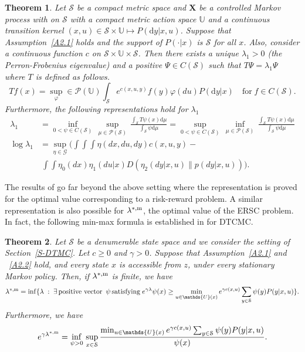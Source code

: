 \documentclass[notitlepage,11pt,reqno]{amsart}
\numberwithin{equation}{section}
\theoremstyle{plain}
\newtheorem{theorem}{Theorem}[section]
\theoremstyle{definition}
\theoremstyle{remark}
\newcommand{\Act}{{\mathds{U}}}
\newcommand{\cG}{{\mathcal{G}}}     %
\newcommand{\Pm}{{\mathcal{P}}}     %
\newcommand{\cS}{{\mathcal{S}}}     %
\newcommand{\lamstrdm}{\lambda^{*,{\rm m}}}
\newcommand{\D}{\mathrm{d}} %
\begin{document}
\begin{theorem}\label{Ven}
Let $\cS$ be a compact metric space and $\textbf{X}$ be a controlled Markov process with on $\cS$ with a compact metric action space $\Act$ and a continuous transition kernel $(x,u) \in \cS\times\Act \mapsto P(\D{y}|x,u)$. Suppose that Assumption~\ref{A2.1} holds and
the support of $P(\cdot|x)$ is $\cS$ for all $x$. Also, consider a continuous function $c$ on $\cS\times\Act\times\cS$.
 Then there exists a unique $\lambda_1>0$ (the Perron-Frobenius eigenvalue) and a positive $\Psi\in C(\cS)$ such that
$T\Psi=\lambda_1\Psi$ where $T$ is defined as follows.
$$T f(x)=\sup_\varphi\in\Pm(\Act)\int_\cS e^{c(x,u,y)} f(y)\varphi(du) P(\D{y}|x)\quad \text{for}\; f\in C(\cS).$$
Furthermore, the following representations hold for $\lambda_1$
\begin{align*}
\lambda_1 &= \inf_{0<\psi\in C(\cS)}\, \sup_{\mu\in\Pm(\cS)}\, \frac{\int_\cS T\psi(x) \D{\mu}}{\int_{\cS} \psi\D{\mu}}
=\sup_{0<\psi\in C(\cS)}\, \inf_{\mu\in\Pm(\cS)}\, \frac{\int_\cS T\psi(x) \D{\mu}}{\int_{\cS} \psi\D{\mu}} \\
\log \lambda_1&= \sup_{\eta\in\cG}\Bigg(\int\int\int\eta(dx,du,dy)c(x,u,y) - \\
& \ \int\int\eta_0(dx)\eta_1(du|x)D(\eta_2(dy|x,u)\|p(dy|x,u))\Bigg).
\end{align*}
\end{theorem}
The results of \cite{MR3629428} go far beyond the above setting where  the representation is proved for the optimal value corresponding to a risk-reward problem.
A similar representation is also possible for $\lamstrdm$, the optimal value of 
the ERSC problem. In fact, the following min-max formula is established in \cite[Theorem~3.1]{MR3846082} for DTCMC.
\begin{theorem}
Let $\cS$ be a denumerable state space and we consider the setting of Section~\ref{S-DTMC}. Let $c\geq 0$ and $\gamma>0$. Suppose that Assumption~\ref{A2.1} and ~\ref{A2.2} hold, and
every state $x$ is accessible from $z$, under every stationary Markov policy. Then, if $\lamstrdm$ is finite, we have
\begin{equation}\label{ET3.12A}
\lamstrdm=\inf\{\lambda\; :\; \exists \, \text{positive vector}\, \ \psi\, \text{satisfying}\; e^{\gamma\lambda}\psi(x)\geq \min_{u\in\Act(x)} e^{\gamma c(x, u)}\sum_{y\in\cS}\psi(y) P(y|x, u) \}.
\end{equation}
Furthermore, we have
\begin{equation}\label{ET3.12B}
e^{\gamma\lamstrdm}=\inf_{\psi>0}\, \sup_{x\in\cS} \frac{\min_{u\in\Act(x)} e^{\gamma c(x, u)}\sum_{y\in\cS}\psi(y) P(y|x, u)}{\psi(x)}.
\end{equation}
\end{theorem}
\end{document}
